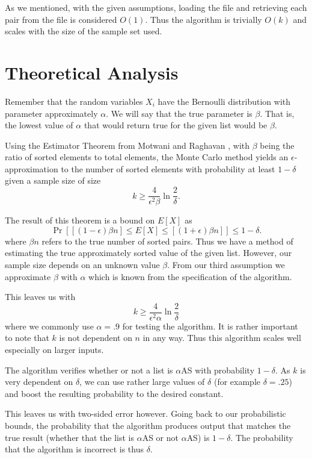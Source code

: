 \documentclass[11pt]{article}
\begin{document}
As we mentioned, with the given assumptions, loading the file and retrieving each pair from the file is considered $O(1)$. Thus the algorithm is trivially $O(k)$ and scales with the size of the sample set used. 

\section{Theoretical Analysis}

Remember that the random variables $X_i$ have the Bernoulli distribution with parameter approximately $\alpha$. We will say that the true parameter is $\beta$. That is, the lowest value of $\alpha$ that would return true for the given list would be $\beta$. 

Using the Estimator Theorem from Motwani and Raghavan \cite{textbook}, with $\beta$ being the ratio of sorted elements to total elements, the Monte Carlo method yields an $\epsilon$-approximation to the number of sorted elements with probability at least $1-\delta$ given a sample size of size $$k \geq \frac{4}{\epsilon^2 \beta} \ln \frac{2}{\delta}.$$ 

The result of this theorem is a bound on $E[X]$ as $$\Pr\left[ [(1-\epsilon)\beta n] \leq E[X] \leq [(1+\epsilon)\beta n] \right] \leq 1 - \delta.$$ where $\beta n$ refers to the true number of sorted pairs. Thus we have a method of estimating the true approximately sorted value of the given list. However, our sample size depends on an unknown value $\beta$. From our third assumption we approximate $\beta$ with $\alpha$ which is known from the specification of the algorithm. 

This leaves us with $$k \geq \frac{4}{\epsilon^2 \alpha} \ln \frac{2}{\delta}$$ where we commonly use $\alpha = .9$ for testing the algorithm. It is rather important to note that $k$ is not dependent on $n$ in any way. Thus this algorithm scales well especially on larger inputs.

The algorithm verifies whether or not a list is $\alpha$AS with probability $1 - \delta$. As $k$ is very dependent on $\delta$, we can use rather large values of $\delta$ (for example $\delta = .25$) and boost the resulting probability to the desired constant. 

This leaves us with two-sided error however. Going back to our probabilistic bounds, the probability that the algorithm produces output that matches the true result (whether that the list is $\alpha$AS or not $\alpha$AS) is $1 - \delta$. The probability that the algorithm is incorrect is thus $\delta$. 
\end{document}

